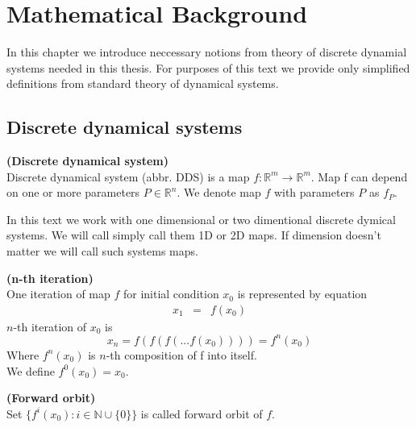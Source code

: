 \chapter{Mathematical Background}
In this chapter we introduce neccessary notions from theory of discrete dynamial systems needed in this thesis.
For purposes of this text we provide only simplified definitions from standard theory of dynamical systems.

\section{Discrete dynamical systems}

\begin{definition} \textbf{(Discrete dynamical system)} \\
    \label{def:discrete dynamical system}
    Discrete dynamical system (abbr. DDS) is a map $f: \mathbb{R}^{m} \rightarrow \mathbb{R}^{m}$.
    Map f can depend on one or more parameters $P \in \mathbb{R}^n$.
    We denote map $f$ with parameters $P$ as $f_P$.
\end{definition}

\begin{remark}
    In this text we work with one dimensional or two dimentional discrete dymical systems.
    We will call simply call them 1D or 2D maps.
    If dimension doesn't matter we will call such systems maps.
\end{remark}

\begin{definition} \textbf{(n-th iteration)} \\
    One iteration of map $f$ for initial condition $x_0$ is represented by equation
    \begin{eqnarray}
        x_{1}  & = & f(x_{0})
    \end{eqnarray}
    $n$-th iteration of $x_0$ is
    \begin{equation}
        x_{n} = f(f(f(...f(x_0)))) = f^{n}(x_0) \nonumber
    \end{equation}
    Where $f^{n}(x_0)$ is $n$-th composition of f into itself. \\
    We define $f^{0}(x_0) = x_0$.
\end{definition}

\begin{definition} \textbf{(Forward orbit)} \\
    Set $\{f^i(x_0):i \in \mathbb{N} \cup \{0\} \}$ is called forward orbit of $f$.
\end{definition}

